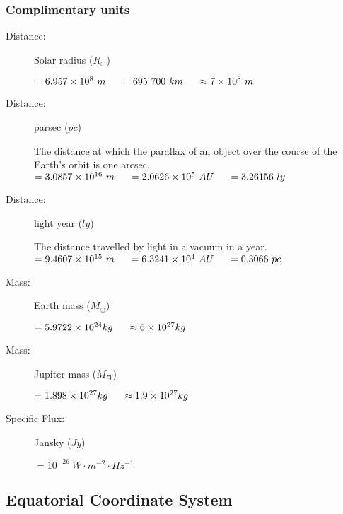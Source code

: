 \subsubsection{Complimentary units}

\begin{description}
\item[Distance:] Solar radius ($R_\odot$)
\begin{itemize}
\items $=6.957 \times 10^8\ m \tab[0.5cm]= 695\ 700\ km \tab[0.5cm] \approx 7 \times 10^8\ m$	
\end{itemize}

\item[Distance:] parsec ($pc$)
\begin{itemize}
\items The distance at which the parallax of an object over the course of the Earth's orbit is one arcsec.
\items $= 3.0857 \times 10^{16}\ m \tab[0.5cm]= 2.0626 \times 10^5\ AU \tab[0.5cm]= 3.26156\ ly$
\end{itemize}

\item[Distance:] light year ($ly$)
\begin{itemize}
\items The distance travelled by light in a vacuum in a year.
\items $= 9.4607 \times 10^{15}\ m \tab[0.5cm] = 6.3241 \times 10^4\ AU \tab[0.5cm]= 0.3066\ pc$
\end{itemize}

\item[Mass:] Earth mass ($M_{\oplus}$)
\begin{itemize}
\items $= 5.9722 \times 10^{24} kg \tab[0.5cm] \approx 6 \times 10^{27} kg $
\end{itemize}

\item[Mass:] Jupiter mass ($M_{\jupiter}$)
\begin{itemize}
\items $= 1.898 \times 10^{27} kg \tab[0.5cm] \approx 1.9 \times 10^{27} kg $
\end{itemize}
                
\item[Specific Flux:] Jansky ($Jy$)
\begin{itemize}
\items $= 10^{-26}\ W\cdot m^{-2} \cdot Hz^{-1}$
\end{itemize}
\end{description}

\subsection{Equatorial Coordinate System}


